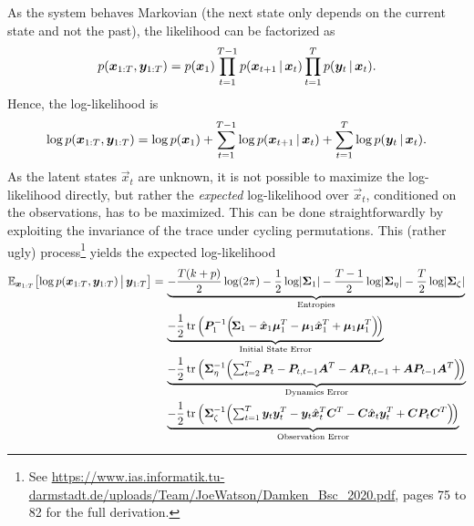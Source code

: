 			As the system behaves Markovian (the next state only depends on the current state and not the past), the likelihood can be factorized as
			\begin{equation*}
				p(\bm{x}_{1:T}, \bm{y}_{1:T}) = p(\bm{x}_1) \prod_{t = 1}^{T - 1} p(\bm{x}_{t + 1} \,\vert\, \bm{x}_t) \prod_{t = 1}^{T} p(\bm{y}_t \,\vert\, \bm{x}_t).
			\end{equation*}
			Hence, the log-likelihood is
			\begin{equation*}
				\log p(\bm{x}_{1:T}, \bm{y}_{1:T}) = \log p(\bm{x}_1) + \sum_{t = 1}^{T - 1} \log p(\bm{x}_{t + 1} \,\vert\, \bm{x}_t) + \sum_{t = 1}^{T} \log p(\bm{y}_t \,\vert\, \bm{x}_t).
			\end{equation*}
			As the latent states \(\vec{x}_t\) are unknown, it is not possible to maximize the log-likelihood directly, but rather the \emph{expected} log-likelihood over \(\vec{x}_t\), conditioned on the observations, has to be maximized. This can be done straightforwardly by exploiting the invariance of the trace under cycling permutations. This (rather ugly) process\footnote{See \url{https://www.ias.informatik.tu-darmstadt.de/uploads/Team/JoeWatson/Damken_Bsc_2020.pdf}, pages 75 to 82 for the full derivation.} yields the expected log-likelihood
			\begin{align*}
				\mathbb{E}_{\bm{x}_{1:T}}\big[\! \log p(\bm{x}_{1:T}, \bm{y}_{1:T}) \,\big\vert\, \bm{y}_{1:T} \big] =\,
				 & \underbrace{-\frac{T (k + p)}{2} \log(2\pi) - \frac{1}{2} \log \lvert \bm{\Sigma}_1 \rvert - \frac{T - 1}{2} \log \lvert \bm{\Sigma}_\eta \rvert - \frac{T}{2} \log \lvert \bm{\Sigma}_\zeta \rvert}_\text{Entropies}                                                            \\
				 & \underbrace{-\frac{1}{2} \tr\Big( \bm{P}_1^{-1} \Big(\! \bm{\Sigma}_1 - \hat{\bm{x}}_1 \bm{\mu}_1^T - \bm{\mu}_1 \hat{\bm{x}}_1^T + \bm{\mu}_1 \bm{\mu}_1^T \Big) \!\Big)}_\text{Initial State Error}                                                                       \\
				 & \underbrace{-\frac{1}{2} \tr\Big( \bm{\Sigma}_\eta^{-1} \Big(\! \textstyle\sum_{t = 2}^{T}\displaystyle \bm{P}_t - \bm{P}_{t, t - 1} \bm{A}^T - \bm{A} \bm{P}_{t, t - 1} + \bm{A} \bm{P}_{t - 1} \bm{A}^T \Big) \!\Big)}_\text{Dynamics Error}                             \\
				 & \underbrace{-\frac{1}{2} \tr\Big( \bm{\Sigma}_\zeta^{-1} \Big(\! \textstyle\sum_{t = 1}^{T}\displaystyle \bm{y}_t \bm{y}_t^T - \bm{y}_t \hat{\bm{x}}_t^T \bm{C}^T - \bm{C} \hat{\bm{x}}_t \bm{y}_t^T + \bm{C} \bm{P}_t \bm{C}^T \Big) \!\Big)}_\text{Observation Error}
			\end{align*}
